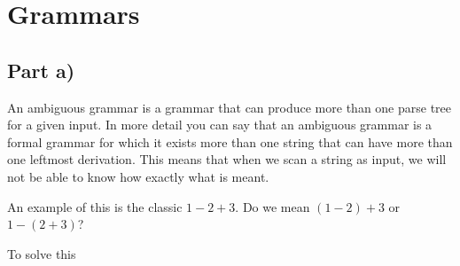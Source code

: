 \documentclass[paper=a4, fontsize=11pt]{scrartcl} %
\numberwithin{equation}{section} %
\numberwithin{figure}{section} %
\numberwithin{table}{section} %
\begin{document}
\section{Grammars}

\subsection{Part a)}
An ambiguous grammar is a grammar that can produce more than one parse tree for a given input. In more detail you can say that an ambiguous grammar is a formal grammar for which it exists more than one string that can have more than one leftmost derivation. This means that when we scan a string as input, we will not be able to know how exactly what is meant.

An example of this is the classic $1-2+3$. Do we mean $(1-2)+3$ or $1-(2+3)$?

To solve this 
\end{document}

